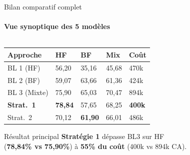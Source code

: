 \documentclass[aspectratio=169, 10pt]{beamer}
\begin{document}
\begin{frame}{Bilan comparatif complet}
\framesubtitle{Vue synoptique des 5 mod\`{e}les}
  \begin{columns}[T]
    \begin{column}{0.54\textwidth}
      \scriptsize
      \renewcommand{\arraystretch}{1.3}
      \begin{tabular}{@{}lC{1.2cm}C{1.2cm}C{1.2cm}C{1.3cm}@{}}
        \toprule
        \color{primary}\textbf{Approche} & \color{primary}\textbf{HF} & \color{primary}\textbf{BF} & \color{primary}\textbf{Mix} & \color{primary}\textbf{Co\^{u}t} \\
        \midrule
        BL 1 (HF)    & 56,20 & 35,16 & 45,68 & 470k \\
        BL 2 (BF)   & 59,07 & 63,66 & 61,36 & 424k \\
        BL 3 (Mixte) & 75,90 & 65,03 & 70,47 & 894k \\
        \textbf{Strat.\ 1} & \textbf{78,84} & 57,65 & 68,25 & \textbf{400k} \\
        Strat.\ 2   & 70,12 & \textbf{61,90} & 66,01 & 486k \\
        \bottomrule
      \end{tabular}

      \medskip
      \begin{exampleblock}{\footnotesize R\'{e}sultat principal}
        \footnotesize \textbf{Strat\'{e}gie 1} d\'{e}passe BL3 sur HF\\
        (\textbf{78,84\% vs 75,90\%}) \`{a} \textbf{55\% du co\^{u}t} (400k vs 894k CA).
      \end{exampleblock}
    \end{column}
    \begin{column}{0.42\textwidth}
      \hspace*{0.15cm}
\end{column}
\end{columns}
\end{frame}
\end{document}
